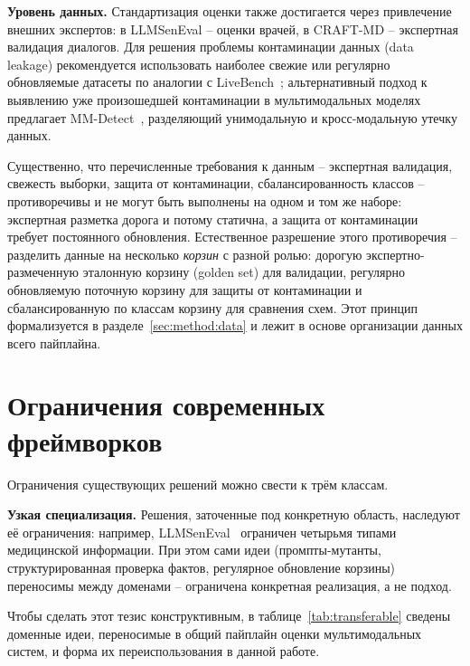 \textbf{Уровень данных.}
Стандартизация оценки также достигается через привлечение внешних
экспертов: в LLMSenEval -- оценки врачей, в CRAFT-MD -- экспертная
валидация диалогов.
Для решения проблемы контаминации данных (data leakage) рекомендуется
использовать наиболее свежие или регулярно обновляемые датасеты по
аналогии с LiveBench~\cite{white2024livebench}; альтернативный подход
к выявлению уже произошедшей контаминации в мультимодальных моделях
предлагает MM-Detect~\cite{song2024mmdetect}, разделяющий унимодальную
и кросс-модальную утечку данных.

Существенно, что перечисленные требования к данным -- экспертная
валидация, свежесть выборки, защита от контаминации, сбалансированность
классов -- противоречивы и не могут быть выполнены на одном и том же
наборе: экспертная разметка дорога и потому статична, а защита от
контаминации требует постоянного обновления.
Естественное разрешение этого противоречия -- разделить данные на
несколько \emph{корзин} с разной ролью: дорогую экспертно-размеченную
эталонную корзину (golden set) для валидации, регулярно обновляемую
поточную корзину для защиты от контаминации и сбалансированную по
классам корзину для сравнения схем.
Этот принцип формализуется в разделе~\ref{sec:method:data} и лежит в
основе организации данных всего пайплайна.

\section{Ограничения современных фреймворков}
\label{sec:related:limitations}

Ограничения существующих решений можно свести к трём классам.

\textbf{Узкая специализация.}
Решения, заточенные под конкретную область, наследуют её ограничения:
например, LLMSenEval~\cite{yan2025llmsemeval} ограничен четырьмя типами
медицинской информации.
При этом сами идеи (промпты-мутанты, структурированная проверка
фактов, регулярное обновление корзины) переносимы между доменами --
ограничена конкретная реализация, а не подход.

Чтобы сделать этот тезис конструктивным, в таблице~\ref{tab:transferable}
сведены доменные идеи, переносимые в общий пайплайн оценки
мультимодальных систем, и форма их переиспользования в данной работе.

